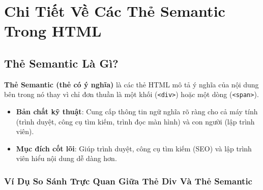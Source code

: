 \documentclass[11pt,oneside]{book}
\newcommand{\thd}[1]{\textcolor{white}{\textbf{\strut #1}}}
\newcommand{\codeinline}[1]{\textcolor{accentOrange}{\texttt{#1}}}
\newcommand{\term}[1]{\textbf{\textcolor{primaryBlue}{#1}}}
\begin{document}
\section{Chi Tiết Về Các Thẻ Semantic Trong HTML}
\label{sec:semantic_html5_masterclass}

\subsection{Thẻ Semantic Là Gì?}

\term{Thẻ Semantic (thẻ có ý nghĩa)} là các thẻ HTML mô tả ý nghĩa của nội dung bên trong nó thay vì chỉ đơn thuần là một khối (\codeinline{<div>}) hoặc một dòng (\codeinline{<span>}).

\begin{itemize}[leftmargin=1.8em, itemsep=4pt, parsep=0pt]
    \item \textbf{Bản chất kỹ thuật}: Cung cấp thông tin ngữ nghĩa rõ ràng cho cả máy tính (trình duyệt, công cụ tìm kiếm, trình đọc màn hình) và con người (lập trình viên).
    \item \textbf{Mục đích cốt lõi}: Giúp trình duyệt, công cụ tìm kiếm (SEO) và lập trình viên hiểu nội dung dễ dàng hơn.
\end{itemize}

\subsubsection{Ví Dụ So Sánh Trực Quan Giữa Thẻ Div Và Thẻ Semantic}

\begin{prettyTableBox}
\end{prettyTableBox}
\end{document}
